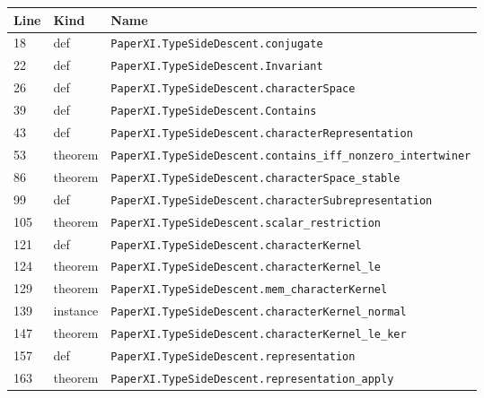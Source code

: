 \documentclass[10pt,oneside]{book}
\begin{document}
\begin{longtable}{@{}p{}p{}p{}@{}}\toprule Line&Kind&Name\\\midrule\endhead

18&def&\nolinkurl{PaperXI.TypeSideDescent.conjugate}\\

22&def&\nolinkurl{PaperXI.TypeSideDescent.Invariant}\\

26&def&\nolinkurl{PaperXI.TypeSideDescent.characterSpace}\\

39&def&\nolinkurl{PaperXI.TypeSideDescent.Contains}\\

43&def&\nolinkurl{PaperXI.TypeSideDescent.characterRepresentation}\\

53&theorem&\nolinkurl{PaperXI.TypeSideDescent.contains_iff_nonzero_intertwiner}\\

86&theorem&\nolinkurl{PaperXI.TypeSideDescent.characterSpace_stable}\\

99&def&\nolinkurl{PaperXI.TypeSideDescent.characterSubrepresentation}\\

105&theorem&\nolinkurl{PaperXI.TypeSideDescent.scalar_restriction}\\

121&def&\nolinkurl{PaperXI.TypeSideDescent.characterKernel}\\

124&theorem&\nolinkurl{PaperXI.TypeSideDescent.characterKernel_le}\\

129&theorem&\nolinkurl{PaperXI.TypeSideDescent.mem_characterKernel}\\

139&instance&\nolinkurl{PaperXI.TypeSideDescent.characterKernel_normal}\\

147&theorem&\nolinkurl{PaperXI.TypeSideDescent.characterKernel_le_ker}\\

157&def&\nolinkurl{PaperXI.TypeSideDescent.representation}\\

163&theorem&\nolinkurl{PaperXI.TypeSideDescent.representation_apply}\\


\end{longtable}
\end{document}
